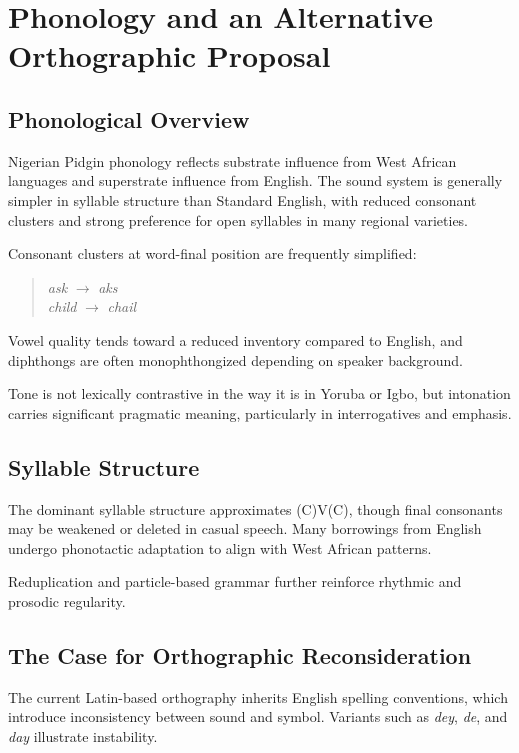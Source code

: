 \documentclass[12pt]{article}
\begin{document}
\section{Phonology and an Alternative Orthographic Proposal}

\subsection{Phonological Overview}

Nigerian Pidgin phonology reflects substrate influence from West African languages and superstrate influence from English. The sound system is generally simpler in syllable structure than Standard English, with reduced consonant clusters and strong preference for open syllables in many regional varieties.

Consonant clusters at word-final position are frequently simplified:

\begin{quote}
\textit{ask} $\rightarrow$ \textit{aks} \\
\textit{child} $\rightarrow$ \textit{chail}
\end{quote}

Vowel quality tends toward a reduced inventory compared to English, and diphthongs are often monophthongized depending on speaker background.

Tone is not lexically contrastive in the way it is in Yoruba or Igbo, but intonation carries significant pragmatic meaning, particularly in interrogatives and emphasis.

\subsection{Syllable Structure}

The dominant syllable structure approximates (C)V(C), though final consonants may be weakened or deleted in casual speech. Many borrowings from English undergo phonotactic adaptation to align with West African patterns.

Reduplication and particle-based grammar further reinforce rhythmic and prosodic regularity.

\subsection{The Case for Orthographic Reconsideration}

The current Latin-based orthography inherits English spelling conventions, which introduce inconsistency between sound and symbol. Variants such as \textit{dey}, \textit{de}, and \textit{day} illustrate instability.
\end{document}
